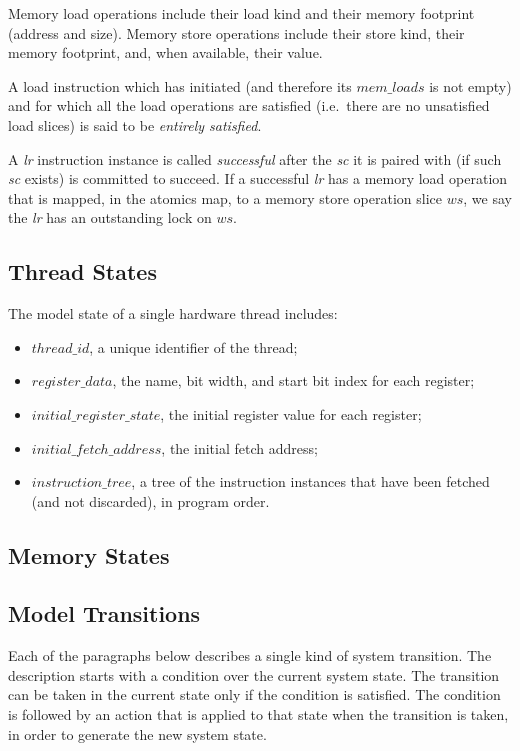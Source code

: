 Memory load operations include their load kind and their memory footprint (address and size).
%
Memory store operations include their store kind, their memory footprint, and, when available, their value.

A load instruction which has initiated (and therefore its $mem\_loads$ is not empty) and for which all the load operations are satisfied (i.e.~there are no unsatisfied load slices) is said to be {\em entirely satisfied}.

A {\em lr} instruction instance is called {\em successful} after the {\em sc} it is paired with (if such {\em sc} exists) is committed to succeed.
If a successful {\em lr} has a memory load operation that is mapped, in the atomics map, to a memory store operation slice $ws$, we say the {\em lr} has an outstanding lock on $ws$. 


\subsection{Thread States}
The model state of a single hardware thread includes:
\begin{itemize}
\item $thread\_id$, a unique identifier of the thread;
\item $register\_data$, the name, bit width, and start bit index for each register;
\item $initial\_register\_state$, the initial register value for each register;
\item $initial\_fetch\_address$, the initial fetch address;
\item $instruction\_tree$, a tree of the instruction instances that have been fetched (and not discarded), in program order.
\end{itemize}

\subsection{Memory States}

\subsection{Model Transitions}\label{sec:omm:thread_trans}

Each of the paragraphs below describes a single kind of system transition.
The description starts with a condition over the current system state.
The transition can be taken in the current state only if the condition is satisfied.
The condition is followed by an action that is applied to that state when the transition is taken, in order to generate the new system state.

